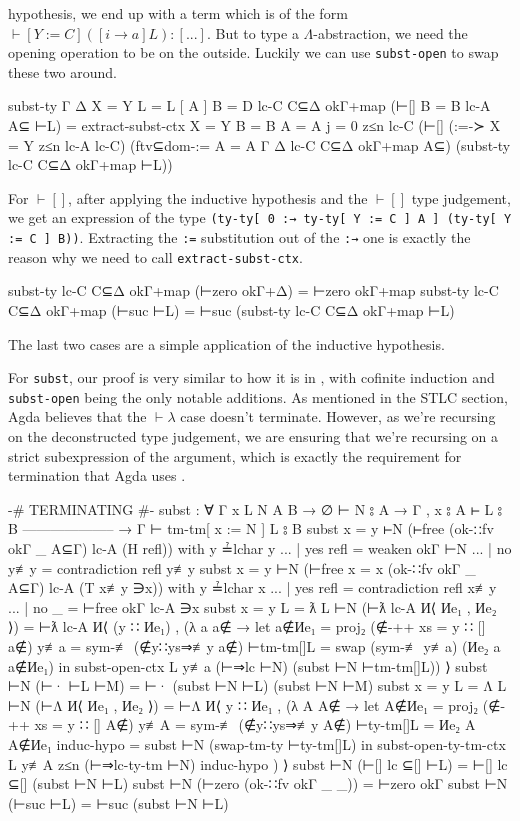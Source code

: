 \documentclass[logo,bsc,singlespacing,parskip,online]{infthesis}
\begin{document}
hypothesis, we end up with a term which is of the form $\vdash [Y := C] ([i \to a] L) \colon [...]$.
But to type a $\Lambda$-abstraction, we need the opening operation to be on the outside. Luckily we
can use \texttt{subst-open} to swap these two around.
\begin{code}
  subst-ty {Γ} {Δ} {X = Y} {L = L [ A ]} {B = D}
      lc-C C⊆Δ okΓ+map (⊢[] {B = B} lc-A A⊆ ⊢L)
    = extract-subst-ctx {X = Y} {B = B} {A = A} {j = 0} z≤n lc-C
      (⊢[]
        (:=-≻ {X = Y} z≤n lc-A lc-C)
        (ftv⊆dom-:= {A = A} Γ Δ lc-C C⊆Δ okΓ+map A⊆)
        (subst-ty lc-C C⊆Δ okΓ+map ⊢L))
\end{code}
For $\vdash[]$, after applying the inductive hypothesis and the $\vdash[]$ type judgement, we get an
expression of the type \texttt{(ty-ty[ 0 :→ ty-ty[ Y := C ] A ] (ty-ty[ Y := C ] B))}. Extracting
the \texttt{:=} substitution out of the \texttt{:→} one is exactly the reason why we need to call
\texttt{extract-subst-ctx}.
\begin{code}
  subst-ty lc-C C⊆Δ okΓ+map (⊢zero okΓ+Δ) = ⊢zero okΓ+map
  subst-ty lc-C C⊆Δ okΓ+map (⊢suc ⊢L) =
    ⊢suc (subst-ty lc-C C⊆Δ okΓ+map ⊢L)
\end{code}
The last two cases are a simple application of the inductive hypothesis.

For \texttt{subst}, our proof is very similar to how it is in \citet{wadler_programming_2022}, with
cofinite induction and \texttt{subst-open} being the only notable additions. As mentioned in the
STLC section, Agda believes that the $\vdash\lambda$ case doesn't terminate. However, as we're
recursing on the deconstructed type judgement, we are ensuring that we're recursing on a strict
subexpression of the argument, which is exactly the requirement for termination that Agda uses
\citep{the_agda_community_termination_2024}.
\begin{code}
  {-# TERMINATING #-}
  subst : ∀ {Γ x L N A B}
    → ∅ ⊢ N ⦂ A
    → Γ , x ⦂ A ⊢ L ⦂ B
      --------------------
    → Γ ⊢ tm-tm[ x := N ] L ⦂ B
  subst {x = y} ⊢N (⊢free (ok-∷fv okΓ _ A⊆Γ) lc-A (H refl)) with y ≟lchar y
  ... | yes refl = weaken okΓ ⊢N
  ... | no  y≢y  = contradiction refl y≢y
  subst {x = y} ⊢N (⊢free {x = x} (ok-∷fv okΓ _ A⊆Γ) lc-A (T x≢y ∋x))
    with y ≟lchar x
  ... | yes refl = contradiction refl x≢y
  ... | no  _    = ⊢free okΓ lc-A ∋x
  subst {x = y} {L = ƛ L} ⊢N (⊢ƛ lc-A И⟨ Иe₁ , Иe₂ ⟩) =
    ⊢ƛ lc-A И⟨ (y ∷ Иe₁) , (λ a {a∉} →
      let a∉Иe₁ = proj₂ (∉-++ {xs = y ∷ []} a∉)
          y≢a = sym-≢ (∉y∷ys⇒≢y a∉)
          ⊢tm-tm[]L = swap (sym-≢ y≢a) (Иe₂ a {a∉Иe₁})
      in subst-open-ctx L y≢a (⊢⇒lc ⊢N) (subst ⊢N ⊢tm-tm[]L)) ⟩
  subst ⊢N (⊢· ⊢L ⊢M) = ⊢· (subst ⊢N ⊢L) (subst ⊢N ⊢M)
  subst {x = y} {L = Λ L} ⊢N (⊢Λ И⟨ Иe₁ , Иe₂ ⟩) =
    ⊢Λ И⟨ y ∷ Иe₁ , (λ A {A∉} →
      let A∉Иe₁ = proj₂ (∉-++ {xs = y ∷ []} A∉)
          y≢A = sym-≢ (∉y∷ys⇒≢y A∉)
          ⊢ty-tm[]L = Иe₂ A {A∉Иe₁}
          induc-hypo = subst ⊢N (swap-tm-ty ⊢ty-tm[]L)
      in subst-open-ty-tm-ctx L y≢A z≤n (⊢⇒lc-ty-tm ⊢N) induc-hypo ) ⟩
  subst ⊢N (⊢[] lc ⊆[] ⊢L) = ⊢[] lc ⊆[] (subst ⊢N ⊢L)
  subst ⊢N (⊢zero (ok-∷fv okΓ _ _)) = ⊢zero okΓ
  subst ⊢N (⊢suc ⊢L) = ⊢suc (subst ⊢N ⊢L)
\end{code}
\end{document}
